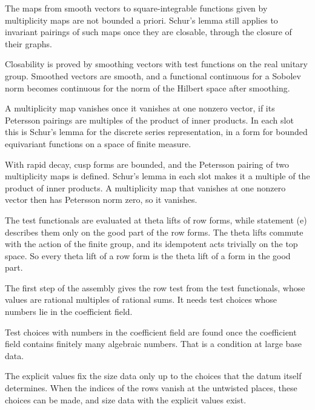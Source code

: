 The maps from smooth vectors to square-integrable functions given by multiplicity maps are not
bounded a priori. Schur's lemma still applies to invariant pairings of such maps once they are
closable, through the closure of their graphs.

Closability is proved by smoothing vectors with test functions on the real unitary group. Smoothed
vectors are smooth, and a functional continuous for a Sobolev norm becomes continuous for the norm of
the Hilbert space after smoothing.

A multiplicity map vanishes once it vanishes at one nonzero vector, if its Petersson pairings are
multiples of the product of inner products. In each slot this is Schur's lemma for the discrete
series representation, in a form for bounded equivariant functions on a space of finite measure.

With rapid decay, cusp forms are bounded, and the Petersson pairing of two multiplicity maps is
defined. Schur's lemma in each slot makes it a multiple of the product of inner products. A
multiplicity map that vanishes at one nonzero vector then has Petersson norm zero, so it vanishes.

The test functionals are evaluated at theta lifts of row forms, while statement (e) describes
them only on the good part of the row forms. The theta lifts commute with the action of the finite
group, and its idempotent acts trivially on the top space. So every theta lift of a row form is
the theta lift of a form in the good part.

The first step of the assembly gives the row test from the test functionals,
whose values are rational multiples of rational sums. It needs test choices
whose numbers lie in the coefficient field.

Test choices with numbers in the coefficient field are found once the
coefficient field contains finitely many algebraic numbers. That is a condition
at large base data.

The explicit values fix the size data only up to the choices that the datum itself determines.
When the indices of the rows vanish at the untwisted places, these choices can be made, and size
data with the explicit values exist.

